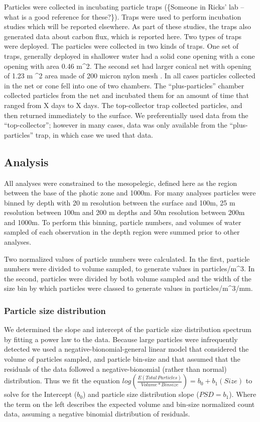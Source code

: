 \documentclass[]{article}
\begin{document}
Particles were collected in incubating particle traps (\{Someone in
Ricks' lab -- what is a good reference for these?\}). Traps were used to
perform incubation studies which will be reported elsewhere. As part of
these studies, the traps also generated data about carbon flux, which is
reported here. Two types of traps were deployed. The particles were
collected in two kinds of traps. One set of traps, generally deployed in
shallower water had a solid cone opening with a cone opening with area
0.46 m\^{}2. The second set had larger conical net with opening of 1.23
m \^{}2 area made of 200 micron nylon mesh . In all cases particles
collected in the net or cone fell into one of two chambers. The
``plus-particles'' chamber collected particles from the net and
incubated them for an amount of time that ranged from X days to X days.
The top-collector trap collected particles, and then returned
immediately to the surface. We preferentially used data from the
``top-collector''; however in many cases, data was only available from
the ``plus-particles'' trap, in which case we used that data.

\hypertarget{analysis}{%
\subsection{Analysis}\label{analysis}}

All analyses were constrained to the mesopelegic, defined here as the
region between the base of the photic zone and 1000m. For many analyses
particles were binned by depth with 20 m resolution between the surface
and 100m, 25 m resolution between 100m and 200 m depths and 50m
resolution between 200m and 1000m. To perform this binning, particle
numbers, and volumes of water sampled of each observation in the depth
region were summed prior to other analyses.

Two normalized values of particle numbers were calculated. In the first,
particle numbers were divided to volume sampled, to generate values in
particles/m\^{}3. In the second, particles were divided by both volume
sampled and the width of the size bin by which particles were classed to
generate values in particles/m\^{}3/mm.

\hypertarget{particle-size-distribution}{%
\subsubsection{Particle size
distribution}\label{particle-size-distribution}}

We determined the slope and intercept of the particle size distribution
spectrum by fitting a power law to the data. Because large particles
were infrequently detected we used a negative-bionomial-general linear
model that considered the volume of particles sampled, and particle
bin-size and that assumed that the residuals of the data followed a
negative-bionomial (rather than normal) distribution. Thus we fit the
equation
\(log(\frac{E(Total\,Particles)}{Volume *Binsize}) = b_0 + b_1(Size)\)
to solve for the Intercept (\(b_0\)) and particle size distribution
slope (\(PSD = b_1\)). Where the term on the left describes the expected
volume and bin-size normalized count data, assuming a negative binomial
distribution of residuals.
\end{document}
